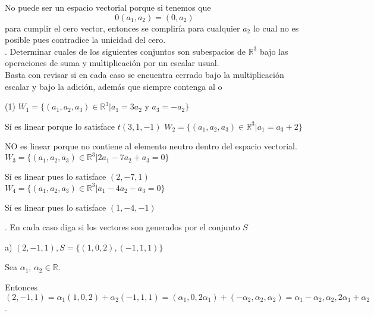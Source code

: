 \documentclass[letterpaper]{article}
\renewcommand{\*}{\cdot}
\theoremstyle{definition}
\begin{document}
No puede ser un espacio vectorial porque si tenemos que \[ 0(a_1, a_2) = (0, a_2)  \] para cumplir el cero vector, entonces se compliría para cualquier $a_2$ lo cual no es posible pues contradice la unicidad del cero.\\

. Determinar cuales de los siguientes conjuntos son subespacios de $\mathbb{R}^{3}$ bajo las operaciones de suma y multiplicación por un escalar usual.\\
Basta con revisar si en cada caso se encuentra cerrado bajo la multiplicación escalar y bajo la adición, además que siempre contenga al o

\begin{tasks}(1)
\task $W_{1} = \lbrace (a_{1},a_{2},a_{3}) \in \mathbb{R}^{3} \big\vert  a_{1}=3a_{2}$ y $a_{3}=-a_{2} \rbrace$

Sí es linear porque lo satisface $t(3,1,-1)$
\task $W_{2} = \lbrace (a_{1},a_{2},a_{3}) \in \mathbb{R}^{3} \big\vert  a_{1} = a_{3} + 2 \rbrace$

NO es linear porque no contiene al elemento neutro dentro del espacio vectorial.
\task $W_{3} = \lbrace (a_{1},a_{2},a_{3}) \in \mathbb{R}^{3} \big\vert  2a_{1} - 7a_{2} + a_{3} = 0 \rbrace$

Sí es linear pues lo satisface $(2,-7,1)$
\task $W_{4} = \lbrace (a_{1},a_{2},a_{3}) \in \mathbb{R}^{3} \big\vert  a_{1} - 4a_{2} - a_{3} = 0 \rbrace$

Sí es linear pues lo satisface $(1,-4,-1)$

\end{tasks}


. En cada caso diga si los vectores son generados por el conjunto $S$


a) $(2,-1,1), S =  \lbrace (1,0,2),(-1,1,1) \rbrace$

Sea $\alpha _1$, $\alpha _2 \in \mathbb{R}$.

Entonces $(2,-1,1) = \alpha _{1}(1,0,2) + \alpha _{2}(-1,1,1) = (\alpha _{1}, 0, 2\alpha _{1})+ (-\alpha _{2},\alpha _{2},\alpha _{2}) = \alpha _{1}-\alpha _{2},\alpha _{2},2\alpha _{1}+\alpha _{2}$.
\end{document}

